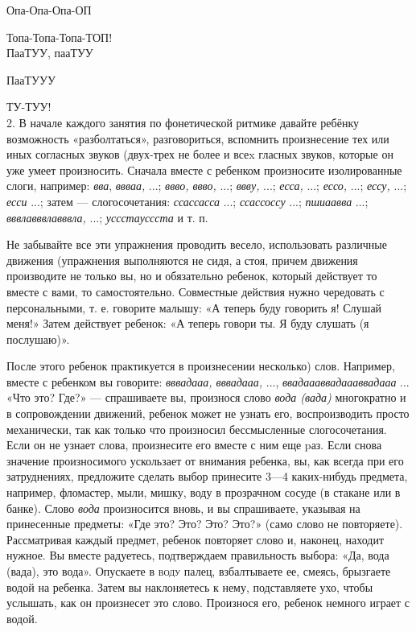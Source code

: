 \documentclass{book}
\renewcommand{\emph}[1]{\textit{#1}}
\begin{document}
Опа-Опа-Опа-ОП

Топа-Топа-Топа-ТОП! \\

ПааТУУ, пааТУУ

ПааТУУУ

ТУ-ТУУ! \\


2. В начале каждого занятия по фонетической ритмике давайте ребёнку
возможность «разболтаться», разговориться, вспомнить произнесение тех
или иных согласных звуков (двух-трех не более и всеx гласных звуков,
которые он уже умеет произносить. Сначала вместе с ребенком произносите
изолированные слоги, например: \emph{вва}, \emph{ввваа,} ...;
\emph{ввво, ввво,} ...; \emph{ввву,} ...; \emph{есса,} ...; \emph{ессо,}
...; \emph{ессу,} ...; \emph{есси} ...; затем --- слогосочетания:
\emph{ссассасса} ...; \emph{ссассоссу} ...; \emph{пшиаавва} ...;
\emph{вввлавввлавввла,} ...; \emph{уссстауссста} и т. п.

Не забывайте все эти упражнения проводить весело, использовать различные
движения (упражнения выполняются не сидя, а стоя, причем движения
производите не только вы, но и обязательно ребенок, который действует то
вместе с вами, то самостоятельно. Совместные действия нужно чередовать с
персональными, т. е. говорите малышу: «А теперь буду говорить я! Слушай
меня!» Затем действует ребенок: «А теперь говори ты. Я буду слушать (я
послушаю)».

После этого ребенок практикуется в произнесении несколько) слов.
Например, вместе с ребенком вы говорите: \emph{вввадааа, вввадааа,} ...,
\emph{ввадаааввадаааввадааа} ... «Что это? Где?» --- спрашиваете вы,
произнося слово \emph{вода (вада)} многократно и в сопровождении
движений, ребенок может не узнать его, воспроизводить просто
механически, так как только что произносил бессмысленные слогосочетания.
Если он не узнает слова, произнесите его вместе с ним еще pаз. Если
снова значение произносимого ускользает от внимания ребенка, вы, как
всегда при его затруднениях, предложите сделать выбор принесите 3---4
каких-нибудь предмета, например, фломастер, мыли, мишку, воду в
прозрачном сосуде (в стакане или в банке). Слово \emph{вода}
произносится вновь, и вы спрашиваете, указывая на принесенные предметы:
«Где это? Это? Это? Это?» (само слово не повторяете). Рассматривая
каждый предмет, ребенок повторяет слово и, наконец, находит нужное. Вы
вместе радуетесь, подтверждаем правильность выбора: «Да, вода (вада),
это вода». Опускаете в \textsc{воду} палец, взбалтываете ее, смеясь,
брызгаете водой на ребенка. Затем вы наклоняетесь к нему, подставляете
ухо, чтобы услышать, как он произнесет это слово. Произнося его, ребенок
немного играет с водой.
\end{document}
